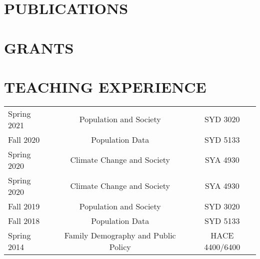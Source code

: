 \documentclass[letterpaper,11pt]{article}
\begin{document}

\section{PUBLICATIONS}



\section{GRANTS}


\section{TEACHING EXPERIENCE}
\begin{tabularx}{\linewidth}{l c c}
\hline
Spring 2021  & Population and Society & SYD 3020\\
Fall 2020  &  Population Data & SYD 5133\\
Spring 2020 & Climate Change and Society & SYA 4930 \\
Spring 2020 & Climate Change and Society & SYA 4930 \\
Fall 2019 & Population and Society & SYD 3020\\
Fall 2018 & Population Data & SYD 5133\\
Spring 2014 & Family Demography and Public Policy & HACE 4400/6400\\
\hline
\end{tabularx}
\end{document}
